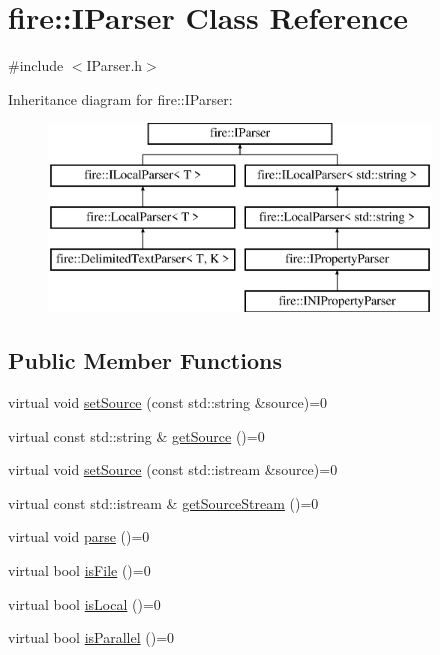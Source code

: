 \hypertarget{a01748}{}\section{fire\+:\+:I\+Parser Class Reference}
\label{a01748}


{\ttfamily \#include $<$I\+Parser.\+h$>$}

Inheritance diagram for fire\+:\+:I\+Parser\+:\begin{figure}[H]
\begin{center}
\leavevmode
\includegraphics[height=5.000000cm]{a01748}
\end{center}
\end{figure}
\subsection*{Public Member Functions}
\begin{DoxyCompactItemize}
\item 
virtual void \hyperlink{a01748_a0dbeff2b9bd8dbfb2aad7a424eef87d1}{set\+Source} (const std\+::string \&source)=0
\item 
virtual const std\+::string \& \hyperlink{a01748_ab55d2644dfa6d950d1f874e1e02df095}{get\+Source} ()=0
\item 
virtual void \hyperlink{a01748_a7748a633910e9bfc27411d6bd840496b}{set\+Source} (const std\+::istream \&source)=0
\item 
virtual const std\+::istream \& \hyperlink{a01748_ac94c7a288bf669322b93ba171c43f90e}{get\+Source\+Stream} ()=0
\item 
virtual void \hyperlink{a01748_af36ac6eedd8c27d2f418869193d7d03c}{parse} ()=0
\item 
virtual bool \hyperlink{a01748_a616c42c85d781c916e97f0ad8f1e9010}{is\+File} ()=0
\item 
virtual bool \hyperlink{a01748_a97b9e58493b3cadbc63e670b0b0e759f}{is\+Local} ()=0
\item 
virtual bool \hyperlink{a01748_a83d2882a466d694fb0aea3d846bcbed4}{is\+Parallel} ()=0
\end{DoxyCompactItemize}


